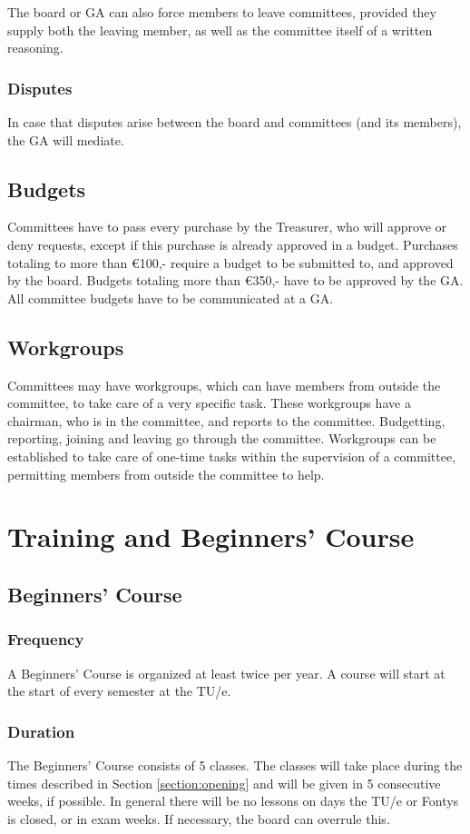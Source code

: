 \documentclass[a4paper]{article}
\begin{document}
The board or { GA} can also force members to leave committees, provided they supply both the leaving member, as well as the committee itself of a written reasoning.

\subsubsection{Disputes}
In case that disputes arise between the board and committees (and its members), the { GA} will mediate.

\subsection{Budgets}
Committees have to pass every purchase by the Treasurer, who will approve or deny requests, except if this purchase is already approved in a budget. Purchases totaling to more than €100,- require a budget to be submitted to, and approved by the board. Budgets totaling more than €350,- have to be approved by the { GA}. All committee budgets have to be communicated at a { GA}.

\subsection{Workgroups}
Committees may have workgroups, which can have members from outside the committee, to take care of a very specific task. These workgroups have a chairman, who is in the committee, and reports to the committee. Budgetting, reporting, joining and leaving go through the committee. Workgroups can be established to take care of one-time tasks within the supervision of a committee, permitting members from outside the committee to help.

\section{Training and Beginners' Course}
\subsection{Beginners' Course}
\subsubsection{Frequency}
A { Beginners' Course} is organized at least twice per year. A course will start at the start of every semester at the { TU/e}.

\subsubsection{Duration}
The { Beginners' Course} consists of 5 classes. The classes will take place during the times described in Section \ref{section:opening} and will be given in 5 consecutive weeks, if possible. In general there will be no lessons on days the { TU/e} or Fontys is closed, or in exam weeks. If necessary, the board can overrule this.
\end{document}
